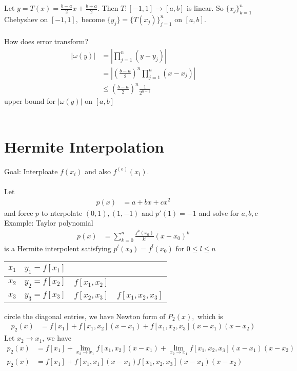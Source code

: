 \documentclass[11pt,oneside]{book}
\theoremstyle{break}
\theoremstyle{break}
\newcommand{\example}{\color{purple}Example: \color{black}}
\begin{document}
Let $y=T(x)=\frac{b-a}{2}x+\frac{b+a}{2}.$ Then $T:[-1,1]\to [a,b]$ is linear. So $\{x_j\}^n_{k=1}$ Chebyshev on $[-1,1],$ become $\{y_j\}=\{T(x_j)\}^n_{j=1}$ on $[a,b]$.\\
\hfill\\
How does error transform? \begin{align*}
|\omega(y)|&=\left|\prod_{j=1}^n (y-y_j)\right|\\
&=\left|\left(\frac{b-a}{2}\right)^n\prod_{j=1}^n(x-x_j) \right|\\
&\leq \left(\frac{b-a}{2}\right)^n\frac{1}{2^{n-1}}
\end{align*}
upper bound for $|\omega(y)|$ on $[a,b]$\\
\hfill\\
\section[Hermite Interploation]{Hermite Interpolation}
\color{red}Goal:\color{black} Interploate $f(x_i)$ and also $f^{(e)}(x_i)$.\\
\hfill\\
Let \begin{align*}
p(x)&=a+bx+cx^2
\end{align*}
and force $p$ to nterpolate $(0,1),(1,-1)$ and $p'(1)=-1$ and solve for $a,b,c$\\
\example Taylor polynomial \begin{align*}
p(x)&=\sum_{k=0}^n \frac{f^{k}(x_0)}{k!}(x-x_0)^k
\end{align*}
is a Hermite interpolent satisfying $p^{l}(x_0)=f^{l}(x_0)$  for $0\leq l\leq n$\begin{center}

\begin{tabular}{|l|l|l|l|}
\hline
$x_1$ & $y_1=f[x_1]$ &  &  \\ \hline
$x_2$ & $y_2=f[x_2]$ & $f[x_1,x_2]$ &  \\ \hline
$x_3$ & $y_3=f[x_3]$ & $f[x_2,x_3]$ & $f[x_1,x_2,x_3]$ \\ \hline
\end{tabular}
\end{center}
circle the diagonal entries, we have Newton form of $P_2(x),$ which is \begin{align*}
p_2(x)&=f[x_1]+f[x_1,x_2](x-x_1)+f[x_1,x_2,x_3](x-x_1)(x-x_2)
\end{align*}
Let $x_2\to x_1$, we have \begin{align*}
p_2(x)&=f[x_1]+\lim_{x_2\to x_1}f[x_1,x_2](x-x_1)+\lim_{x_2\to x_1}f[x_1,x_2,x_3](x-x_1)(x-x_2)\\
p_2(x)&=f[x_1]+f[x_1,x_1](x-x_1)f[x_1,x_2,x_3](x-x_1)(x-x_2)\\
\end{align*}
\end{document}
